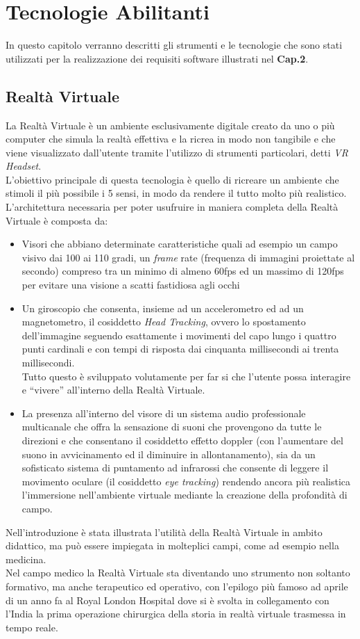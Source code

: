 \chapter{Tecnologie Abilitanti}
In questo capitolo verranno descritti gli strumenti e le tecnologie che sono stati utilizzati per la realizzazione dei requisiti software illustrati nel \textbf{Cap.2}.
\section{Realtà Virtuale}
La Realtà Virtuale\cite{VRRe} è un ambiente esclusivamente digitale creato da uno o più computer che simula la realtà effettiva e la ricrea in modo non tangibile e che viene visualizzato dall'utente tramite l'utilizzo di strumenti particolari, detti \textit{VR Headset}.
\\L'obiettivo principale di questa tecnologia è quello di ricreare un ambiente che stimoli il più possibile i 5 sensi, in modo da rendere il tutto molto più realistico.
\\L'architettura necessaria per poter usufruire in maniera completa della Realtà Virtuale è composta da:
\begin{itemize}
    \item Visori che abbiano determinate caratteristiche quali ad esempio un campo visivo dai 100 ai 110 gradi, un \textit{frame} rate (frequenza di immagini proiettate al secondo) compreso tra un minimo di almeno 60fps ed un massimo di 120fps per evitare una visione a scatti fastidiosa agli occhi
    \item Un giroscopio che consenta, insieme ad un accelerometro ed ad un magnetometro, il cosiddetto \textit{Head Tracking}, ovvero lo spostamento dell'immagine seguendo esattamente i movimenti del capo lungo i quattro punti cardinali e con tempi di risposta dai cinquanta millisecondi ai trenta millisecondi. 
    \\Tutto questo è sviluppato volutamente per far si che l'utente possa interagire e “vivere” all'interno della Realtà Virtuale. 
    \item La presenza all'interno del visore di un sistema audio professionale multicanale che offra la sensazione di suoni che provengono da tutte le direzioni e che consentano il cosiddetto effetto doppler (con l'aumentare del suono in avvicinamento ed il diminuire in allontanamento), sia da un sofisticato sistema di puntamento ad infrarossi che consente di leggere il movimento oculare (il cosiddetto \textit{eye tracking}) rendendo ancora più realistica l'immersione nell'ambiente virtuale mediante la creazione della profondità di campo.
\end{itemize} 
Nell'introduzione è stata illustrata l'utilità della Realtà Virtuale in ambito didattico, ma può essere impiegata in molteplici campi, come ad esempio nella medicina.
\\Nel campo medico la Realtà Virtuale sta diventando uno strumento non soltanto formativo, ma anche terapeutico ed operativo, con l'epilogo più famoso ad aprile di un anno fa al Royal London Hospital dove si è svolta in collegamento con l'India la prima operazione chirurgica della storia in realtà virtuale trasmessa in tempo reale.

